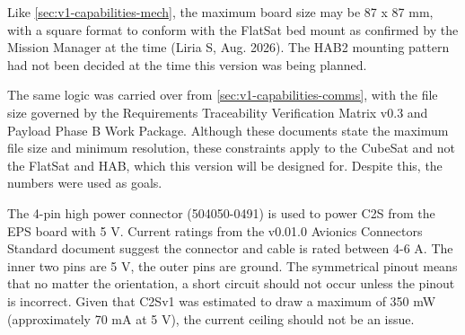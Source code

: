 Like \autoref{sec:v1-capabilities-mech}, the maximum board size may be 87 x 87 mm, with a square format to conform with the FlatSat bed mount as confirmed by the Mission Manager at the time (Liria S, Aug. 2026). The HAB2 mounting pattern had not been decided at the time this version was being planned.

The same logic was carried over from \autoref{sec:v1-capabilities-comms}, with the file size governed by the Requirements Traceability Verification Matrix v0.3 and Payload Phase B Work Package. Although these documents state the maximum file size and minimum resolution, these constraints apply to the CubeSat and not the FlatSat and HAB, which this version will be designed for. Despite this, the numbers were used as goals.

The 4-pin high power connector (504050-0491) is used to power C2S from the EPS board with 5 V. Current ratings from the v0.01.0 Avionics Connectors Standard document suggest the connector and cable is rated between 4-6 A. The inner two pins are 5 V, the outer pins are ground.
The symmetrical pinout means that no matter the orientation, a short circuit should not occur unless the pinout is incorrect.
\nl
Given that C2Sv1 was estimated to draw a maximum of 350 mW (approximately 70 mA at 5 V), the current ceiling should not be an issue.